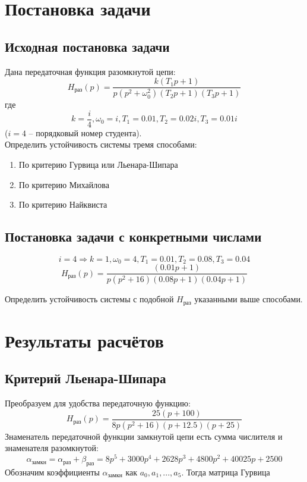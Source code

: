 \documentclass[a4paper,12pt]{article}
\begin{document}


\section{Постановка задачи}
\subsection{Исходная постановка задачи}

Дана передаточная функция разомкнутой цепи:
\[ H_{\text{раз}}(p) = \frac{ k(T_1 p + 1) }{p (p^2 + \omega_0^2)(T_2 p + 1) (T_3 p + 1)} \]
где
\[ k = \frac{i}{4}, \omega_0 = i, T_1 = 0.01, T_2 = 0.02i, T_3 = 0.01i \]
($ i = 4 $ -- порядковый номер студента). \\

Определить устойчивость системы тремя способами:

\begin{enumerate}[noitemsep]
    \item По критерию Гурвица или Льенара-Шипара
    \item По критерию Михайлова
    \item По критерию Найквиста
\end{enumerate}

\subsection{Постановка задачи с конкретными числами}
\[ i = 4 \Rightarrow k = 1, \omega_0 = 4, T_1 = 0.01, T_2 = 0.08, T_3 = 0.04 \]
\[ H_{\text{раз}}(p) = \frac{ (0.01 p + 1) }{p (p^2 + 16)(0.08 p + 1) (0.04 p + 1)} \]

Определить устойчивость системы с подобной $ H_{\text{раз}} $ указанными выше способами.

\section{ Результаты расчётов }

\subsection{ Критерий Льенара-Шипара }

Преобразуем для удобства передаточную функцию:
\[ H_{\text{раз}}(p)  = \frac{25(p+100)}{8p(p^2+16)(p+12.5)(p+25)}  \]
Знаменатель передаточной функции замкнутой цепи есть сумма числителя и знаменателя разомкнутой:
\[ \alpha_{\text{замкн}} = \alpha_{\text{раз}} + \beta_{\text{раз}} = 8 p^5 + 3000 p^4 + 2628 p^3 + 4800 p^2 + 40025 p + 2500 \]
Обозначим коэффициенты $ \alpha_{\text{замкн}} $ как $ a_0, a_1, ..., a_5 $.
Тогда матрица Гурвица
\end{document}

